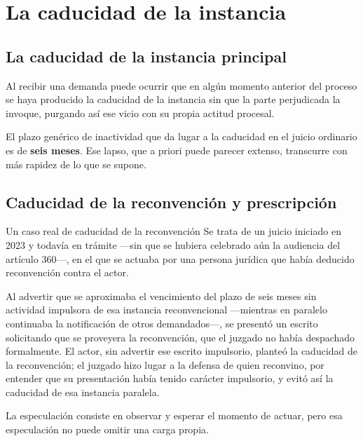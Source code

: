 \documentclass[12pt,oneside]{book}
\begin{document}
\chapter[La caducidad de la instancia]{La caducidad de la instancia}

\section{La caducidad de la instancia principal}

Al recibir una demanda puede ocurrir que en algún momento anterior del proceso se haya producido la caducidad de la instancia sin que la parte perjudicada la invoque, purgando así ese vicio con su propia actitud procesal.

El plazo genérico de inactividad que da lugar a la caducidad en el juicio ordinario es de \textbf{seis meses}. Ese lapso, que a priori puede parecer extenso, transcurre con más rapidez de lo que se supone.

\section{Caducidad de la reconvención y prescripción}

\begin{example}{Un caso real de caducidad de la reconvención}
Se trata de un juicio iniciado en 2023 y todavía en trámite ---sin que se hubiera celebrado aún la audiencia del artículo 360---, en el que se actuaba por una persona jurídica que había deducido reconvención contra el actor.

Al advertir que se aproximaba el vencimiento del plazo de seis meses sin actividad impulsora de esa instancia reconvencional ---mientras en paralelo continuaba la notificación de otros demandados---, se presentó un escrito solicitando que se proveyera la reconvención, que el juzgado no había despachado formalmente. El actor, sin advertir ese escrito impulsorio, planteó la caducidad de la reconvención; el juzgado hizo lugar a la defensa de quien reconvino, por entender que su presentación había tenido carácter impulsorio, y evitó así la caducidad de esa instancia paralela.
\end{example}

La especulación consiste en observar y esperar el momento de actuar, pero esa especulación no puede omitir una carga propia.
\end{document}
